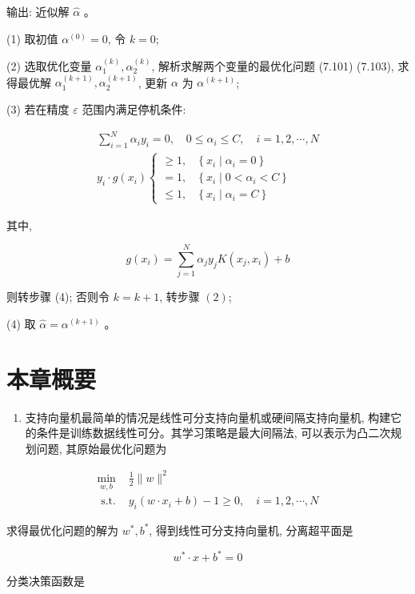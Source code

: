 \documentclass[10pt]{article}
\begin{document}
输出: 近似解 $\hat{\alpha}$ 。

(1) 取初值 $\alpha^{(0)}=0$, 令 $k=0$;

(2) 选取优化变量 $\alpha_{1}^{(k)}, \alpha_{2}^{(k)}$, 解析求解两个变量的最优化问题 (7.101) (7.103), 求得最优解 $\alpha_{1}^{(k+1)}, \alpha_{2}^{(k+1)}$, 更新 $\alpha$ 为 $\alpha^{(k+1)}$;

(3) 若在精度 $\varepsilon$ 范围内满足停机条件:

$$
\begin{gathered}
\sum_{i=1}^{N} \alpha_{i} y_{i}=0, \quad 0 \leqslant \alpha_{i} \leqslant C, \quad i=1,2, \cdots, N \\
y_{i} \cdot g\left(x_{i}\right) \begin{cases}\geqslant 1, & \left\{x_{i} \mid \alpha_{i}=0\right\} \\
=1, & \left\{x_{i} \mid 0<\alpha_{i}<C\right\} \\
\leqslant 1, & \left\{x_{i} \mid \alpha_{i}=C\right\}\end{cases}
\end{gathered}
$$

其中,

$$
g\left(x_{i}\right)=\sum_{j=1}^{N} \alpha_{j} y_{j} K\left(x_{j}, x_{i}\right)+b
$$

则转步骤 (4); 否则令 $k=k+1$, 转步骤 $(2)$;

(4) 取 $\hat{\alpha}=\alpha^{(k+1)}$ 。

\section*{本章概要}
\begin{enumerate}
  \item 支持向量机最简单的情况是线性可分支持向量机或硬间隔支持向量机, 构建它的条件是训练数据线性可分。其学习策略是最大间隔法, 可以表示为凸二次规划问题, 其原始最优化问题为
\end{enumerate}

$$
\begin{array}{ll}
\min _{w, b} & \frac{1}{2}\|w\|^{2} \\
\text { s.t. } & y_{i}\left(w \cdot x_{i}+b\right)-1 \geqslant 0, \quad i=1,2, \cdots, N
\end{array}
$$

求得最优化问题的解为 $w^{*}, b^{*}$, 得到线性可分支持向量机, 分离超平面是

$$
w^{*} \cdot x+b^{*}=0
$$

分类决策函数是
\end{document}

